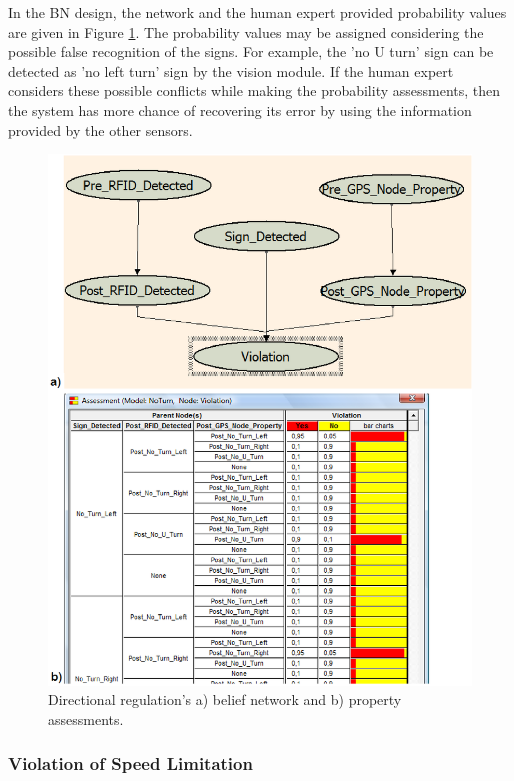 \documentclass[a4paper,oneside,12pt]{report}
\begin{document}
In the BN design, the network and the human expert provided probability values are given in Figure \ref{fig:bnsign}. The probability values may be assigned considering the possible false recognition of the signs. For example, the 'no U turn' sign can be detected as 'no left turn' sign by the vision module. If the human expert considers these possible conflicts while making the probability assessments, then the system has more chance of recovering its error by using the information provided by the other sensors.
\begin{figure}[ht]
\begin{center}
\includegraphics[scale=0.666]{img/no_turn_bn.eps}
\caption{Directional regulation's a) belief network and b) property assessments.}
\label{fig:bnsign}
\end{center}
\end{figure}

\subsubsection{Violation of Speed Limitation}
\end{document}
